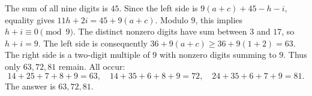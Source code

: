 The sum of all nine digits is $45$. Since the left side is $9(a+c)+45-h-i$, equality gives $11h+2i=45+9(a+c)$. Modulo $9$, this implies $h+i\equiv0\pmod9$. The distinct nonzero digits have sum between $3$ and $17$, so $h+i=9$.
The left side is consequently $36+9(a+c)\ge36+9(1+2)=63$. The right side is a two-digit multiple of $9$ with nonzero digits summing to $9$. Thus only $63,72,81$ remain. All occur:
\[14+25+7+8+9=63,\quad14+35+6+8+9=72,\quad24+35+6+7+9=81.\]
The answer is $\boxed{63,72,81}$.
